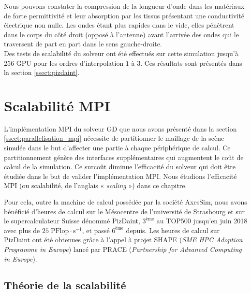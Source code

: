 Nous pouvons constater la compression de la longueur d'onde
dans les matériaux de forte permittivité et leur absorption
par les tissus présentant une conductivité électrique non nulle.
Les ondes étant plus rapides dans le vide, elles pénètrent
dans le corps du côté droit (opposé à l'antenne) avant l'arrivée des
ondes qui le traversent de part en part dans le sens gauche-droite.
\\


Des tests de scalabilité du solveur ont été effectués
sur cette simulation jusqu'à $256$ GPU pour les ordres
d’interpolation $1$ à $3$. Ces résultats sont présentés dans 
la section \ref{ssect:pizdaint}.
\\



\section{Scalabilité MPI}
\label{sect:scalabilite}


L'implémentation MPI du solveur GD que nous avons présenté dans la
section \ref{ssect:parallelisation_mpi} nécessite de partitionner
le maillage de la scène simulée dans le but d'affecter
une partie à chaque périphérique de calcul.
Ce partitionnement génère des interfaces supplémentaires qui
augmentent le coût de calcul de la simulation.
Ce surcoût diminue l'efficacité du solveur qui doit être étudiée
dans le but de valider l'implémentation MPI.
Nous étudions l'efficacité MPI (ou scalabilité, de l'anglais
« \textit{scaling} ») dans ce chapitre.

Pour cela, outre la machine de calcul possédée par la société
AxesSim, nous avons bénéficié d'heures de calcul sur le Mésocentre
de l'université de Strasbourg et sur le supercalculateur Suisse dénommé PizDaint,
$3^\textrm{ème}$ au TOP500 \cite{Strohmaier:2006:TS:1188455.1188474} jusqu'en juin 2018
avec plus de $25 \; \mathrm{PFlop} \cdot \mathrm{s}^{-1}$, et passé $6^\textrm{ème}$ depuis.
Les heures de calcul sur PizDaint ont été obtenues grâce à l'appel
à projet SHAPE (\textit{SME HPC Adoption Programme in 
Europe}) lancé par PRACE (\textit{Partnership for Advanced Computing in Europe}).
\\



\subsection{Théorie de la scalabilité}
\label{ssect:theorie_scalabilite}

